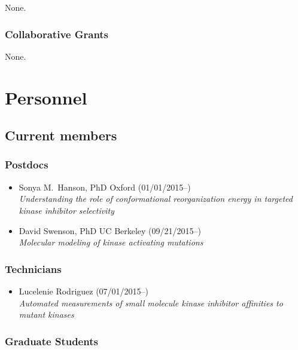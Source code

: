 \documentclass[10pt]{article}
\begin{document}
None.

\subsubsection*{Collaborative Grants}

None.

\eject


\section*{Personnel}

\subsection*{Current members}

\subsubsection*{Postdocs}

\begin{itemize}
  \item Sonya M.~Hanson, PhD Oxford (01/01/2015--)\\
  \emph{Understanding the role of conformational reorganization energy in targeted kinase inhibitor selectivity}

  \item David Swenson, PhD UC Berkeley (09/21/2015--)\\
  \emph{Molecular modeling of kinase activating mutations}
\end{itemize}

\subsubsection*{Technicians}

\begin{itemize}
  \item Lucelenie Rodriguez (07/01/2015--)\\
  \emph{Automated measurements of small molecule kinase inhibitor affinities to mutant kinases}
\end{itemize}

\subsubsection*{Graduate Students}
\end{document}
